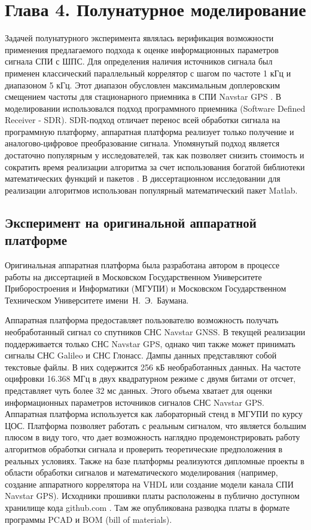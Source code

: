 \setcounter{chapter}{4}
\setcounter{section}{0}
\setcounter{equation}{0}
\setcounter{figure}{0}
\chapter*{Глава 4. Полунатурное моделирование}
\label{ss:hw}

Задачей полунатурного эксперимента являлась верификация возможности применения предлагаемого подхода к оценке информационных параметров сигнала СПИ с ШПС. Для определения наличия источников
сигнала был применен классический параллельный коррелятор \cite{tsui} с шагом по частоте 1 кГц и диапазоном 5 кГц. Этот диапазон обусловлен максимальным доплеровским
смещением частоты для стационарного приемника в СПИ Navstar GPS \cite{shahtarin_sync, tsui}. В моделировании использовался подход программного приемника
(Software Defined Receiver - SDR). SDR-подход отличает перенос всей обработки сигнала на программную платформу, аппаратная платформа реализует только
получение и аналогово-цифровое  преобразование сигнала. Упомянутый подход является достаточно популярным у исследователей, так как позволяет снизить стоимость и
сократить время реализации алгоритма за счет использования богатой библиотеки математических функций и пакетов \cite{grayver-book}.
В диссертационном исследовании для реализации алгоритмов использован популярный математический пакет Matlab.

\section{Эксперимент на оригинальной аппаратной платформе}
Оригинальная аппаратная платформа была разработана автором в процессе работы на диссертацией в 
Московском Государственном Университете Приборостроения и Информатики (МГУПИ) и Московском Государственном Техническом Университете \mbox{имени Н. Э. Баумана.}

Аппаратная платформа предоставляет пользователю возможность получать необработанный сигнал со спутников СНС Navstar GNSS. В текущей реализации поддерживается только 
СНС Navstar GPS, однако чип также может принимать сигналы СНС Galileo и СНС Глонасс. Дампы данных представляют собой текстовые файлы. В них содержится 256 кБ необработанных данных.
На частоте оцифровки 16.368 МГц в двух квадратурном режиме с двумя битами от отсчет, представляет чуть более 32 мс данных.
Этого объема хватает для оценки информационных параметров источников сигналов СНС Navstar GPS.
Аппаратная платформа используется как лабораторный стенд в МГУПИ по курсу ЦОС. Платформа позволяет работать с реальным сигналом, что является большим плюсом в
виду того, что дает возможность наглядно продемонстрировать работу алгоритмов обработки сигнала и проверить теоретические предположения в реальных условиях.
Также на базе платформы реализуются дипломные проекты в области обработки сигналов и математического моделирования
(например, создание аппаратного коррелятора на VHDL или создание модели канала СПИ Navstar GPS).
Исходники прошивки платы расположены в публично доступном хранилище кода github.com \cite{github-gpsproject}.
Там же опубликована разводка платы в формате программы PCAD и BOM (bill of materials).

